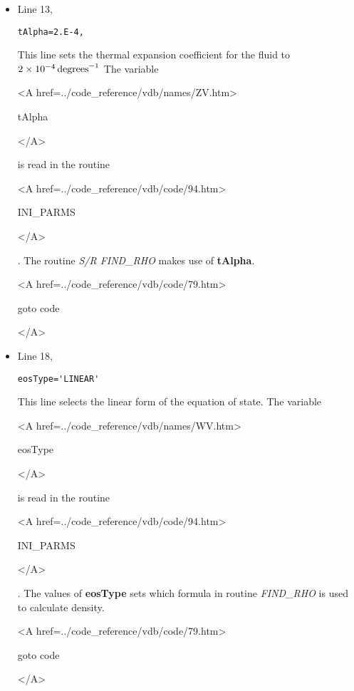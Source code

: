 \begin{itemize}
\item Line 13,
\begin{verbatim}
tAlpha=2.E-4,
\end{verbatim}
This line sets the thermal expansion coefficient for the fluid
to $2 \times 10^{-4}\,{\rm degrees}^{-1}$
The variable
{\bf
\begin{rawhtml} <A href=../code_reference/vdb/names/ZV.htm> \end{rawhtml}
tAlpha 
\begin{rawhtml} </A>\end{rawhtml}
}
is read in the routine
{\it
\begin{rawhtml} <A href=../code_reference/vdb/code/94.htm> \end{rawhtml}
INI\_PARMS
\begin{rawhtml} </A>\end{rawhtml}
}. The routine {\it S/R FIND\_RHO} makes use of {\bf tAlpha}.

{\bf
\begin{rawhtml} <A href=../code_reference/vdb/code/79.htm> \end{rawhtml}
goto code
\begin{rawhtml} </A>\end{rawhtml}
}

\item Line 18,
\begin{verbatim}
eosType='LINEAR'
\end{verbatim}
This line selects the linear form of the equation of state.
The variable
{\bf
\begin{rawhtml} <A href=../code_reference/vdb/names/WV.htm> \end{rawhtml}
eosType
\begin{rawhtml} </A>\end{rawhtml}
}
is read in the routine
{\it
\begin{rawhtml} <A href=../code_reference/vdb/code/94.htm> \end{rawhtml}
INI\_PARMS
\begin{rawhtml} </A>\end{rawhtml}
}. The values of {\bf eosType} sets which formula in routine
{\it FIND\_RHO} is used to calculate density.

{\bf
\begin{rawhtml} <A href=../code_reference/vdb/code/79.htm> \end{rawhtml}
goto code
\begin{rawhtml} </A>\end{rawhtml}
}




\end{itemize}
